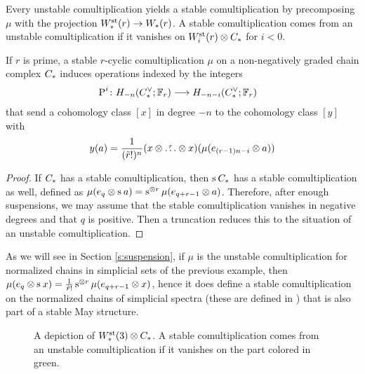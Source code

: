 Every unstable comultiplication yields a stable comultiplication by precomposing $\mu$ with the projection $\Wst(r)\to \W(r)$. A stable comultiplication comes from an unstable comultiplication if it vanishes on $\Wst[i](r) \ot  \ucadenas$ for $i<0$.

\begin{proposition}
	If $r$ is prime, a stable $r$-cyclic comultiplication $\mu$ on a non-negatively graded chain complex $\ucadenas$ induces operations indexed by the integers
	\begin{align*}
		\power^{i} \colon  H_{-n}(\ucocadenas;\mathbb{F}_r)&\lra H_{-n-i}(\ucocadenas;\mathbb{F}_r)
	\end{align*}
	that send a cohomology class $[x]$ in degree $-n$ to the cohomology class $[y]$ with
	\[
	y(a) = \frac{1}{(\tilde{r}!)^n}(x \ot  \overset{r}{\ldots} \ot  x)(\mu(e_{(r-1)n-i} \ot  a))
	\]
\end{proposition}
\begin{proof} If $\ucadenas$ has a stable comultiplication, then $\sus{} \ucadenas$ has a stable comultiplication as well, defined as $\mu(e_q \ot  \sus{} a) = \sus{ \ot  r}\mu(e_{q+r-1} \ot  a)$. Therefore, after enough suspensions, we may assume that the stable comultiplication vanishes in negative degrees and that $q$ is positive. Then a truncation reduces this to the situation of an unstable comultiplication.
\end{proof}
\begin{example}
	As we will see in Section \ref{s:suspension}, if $\mu$ is the unstable comultiplication for normalized chains in simplicial sets of the previous example, then $\mu(e_q \ot  \sus{} x) = \frac{1}{\tilde{r}!}\sus{ \ot  r} \mu(e_{q+r-1} \ot  x)$, hence it does define a stable comultiplication on the normalized chains of simplicial spectra (these are defined in \cite{Gill2020}) that is also part of a stable May structure.
\end{example}


\begin{figure}

\caption{A depiction of $\Wst(3) \ot  \ucadenas$. A stable comultiplication comes from an unstable comultiplication if it vanishes on the part colored in green. }
\end{figure}



